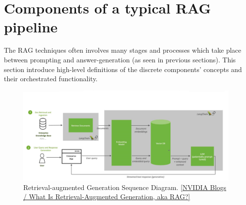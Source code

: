 \section{Components of a typical RAG pipeline}
The RAG techniques often involves many stages and processes which take place between prompting and answer-generation (as seen in previous sections).
This section introduce high-level definitions of the discrete components' concepts and their orchestrated functionality.
\begin{figure}[htbp]
    \centering
    \includegraphics[width=\linewidth]{./figures/NVIDIA-RAG-diagram-scaled.jpg}
    \caption{Retrieval-augmented Generation Sequence Diagram. \href{https://blogs.nvidia.com/blog/what-is-retrieval-augmented-generation/}{[NVIDIA Blogs / What Is Retrieval-Augmented Generation, aka RAG?]}}
\end{figure}
\newpage

